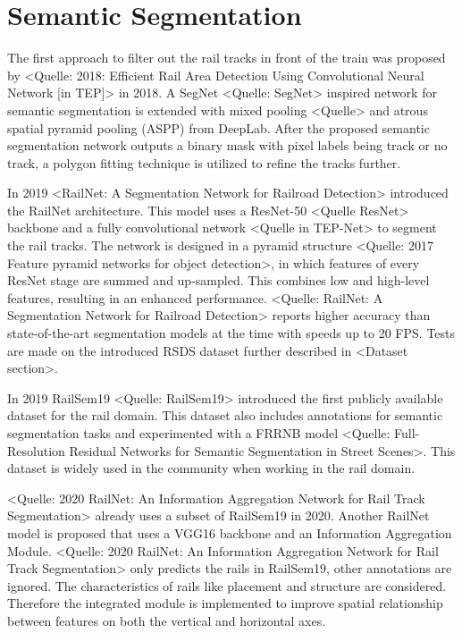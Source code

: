 \section{Semantic Segmentation}
\label{sec:SemanticSegmentation}

The first approach to filter out the rail tracks in front of the train was proposed by <Quelle: 2018: Efficient Rail Area Detection Using Convolutional Neural Network [in TEP]> in 2018.
A SegNet <Quelle: SegNet> inspired network for semantic segmentation is extended with mixed pooling <Quelle> and atrous spatial pyramid pooling (ASPP) from DeepLab.
After the proposed semantic segmentation network outputs a binary mask with pixel labels being track or no track, a polygon fitting technique is utilized to refine the tracks further.

In 2019 <RailNet: A Segmentation Network for Railroad Detection> introduced the RailNet architecture.
This model uses a ResNet-50 <Quelle ResNet> backbone and a fully convolutional network <Quelle in TEP-Net> to segment the rail tracks.
The network is designed in a pyramid structure <Quelle: 2017 Feature pyramid networks for object detection>, in which features of every ResNet stage are summed and up-sampled.
This combines low and high-level features, resulting in an enhanced performance.
<Quelle: RailNet: A Segmentation Network for Railroad Detection> reports higher accuracy than state-of-the-art segmentation models at the time with speeds up to 20 FPS.
Tests are made on the introduced RSDS dataset further described in <Dataset section>.

In 2019 RailSem19 <Quelle: RailSem19> introduced the first publicly available dataset for the rail domain.
This dataset also includes annotations for semantic segmentation tasks and experimented with a FRRNB model <Quelle: Full-Resolution Residual Networks for Semantic Segmentation in Street Scenes>.
This dataset is widely used in the community when working in the rail domain.

<Quelle: 2020 RailNet: An Information Aggregation Network for Rail Track Segmentation> already uses a subset of RailSem19 in 2020.
Another RailNet model is proposed that uses a VGG16 backbone and an Information Aggregation Module.
<Quelle: 2020 RailNet: An Information Aggregation Network for Rail Track Segmentation> only predicts the rails in RailSem19, other annotations are ignored.
The characteristics of rails like placement and structure are considered.
Therefore the integrated module is implemented to improve spatial relationship between features on both the vertical and horizontal axes.

